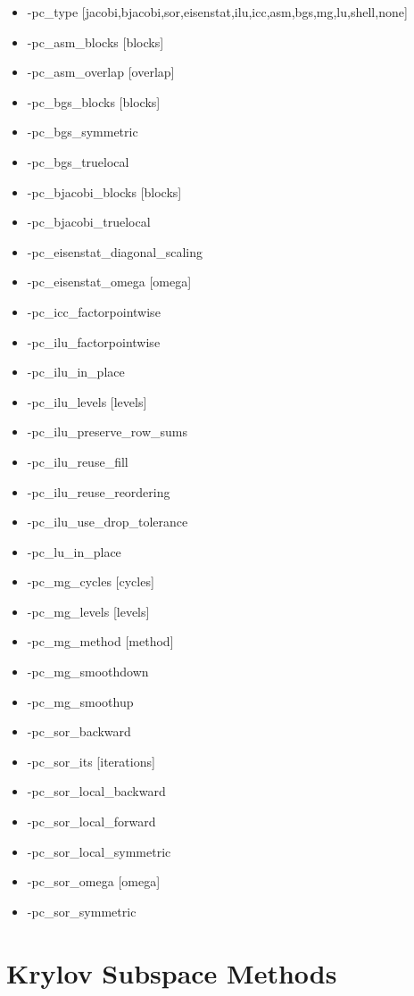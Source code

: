\begin{itemize}
\item -pc\_type [jacobi,bjacobi,sor,eisenstat,ilu,icc,asm,bgs,mg,lu,shell,none]
\item -pc\_asm\_blocks [blocks]
\item -pc\_asm\_overlap [overlap]
\item -pc\_bgs\_blocks [blocks]
\item -pc\_bgs\_symmetric
\item -pc\_bgs\_truelocal
\item -pc\_bjacobi\_blocks [blocks]
\item -pc\_bjacobi\_truelocal
\item -pc\_eisenstat\_diagonal\_scaling
\item -pc\_eisenstat\_omega [omega]
\item -pc\_icc\_factorpointwise
\item -pc\_ilu\_factorpointwise
\item -pc\_ilu\_in\_place
\item -pc\_ilu\_levels [levels]
\item -pc\_ilu\_preserve\_row\_sums
\item -pc\_ilu\_reuse\_fill
\item -pc\_ilu\_reuse\_reordering
\item -pc\_ilu\_use\_drop\_tolerance
\item -pc\_lu\_in\_place
\item -pc\_mg\_cycles [cycles]
\item -pc\_mg\_levels [levels]
\item -pc\_mg\_method [method]
\item -pc\_mg\_smoothdown
\item -pc\_mg\_smoothup
\item -pc\_sor\_backward
\item -pc\_sor\_its [iterations]
\item -pc\_sor\_local\_backward
\item -pc\_sor\_local\_forward
\item -pc\_sor\_local\_symmetric
\item -pc\_sor\_omega [omega]
\item -pc\_sor\_symmetric
\end{itemize}


{\small
\noindent

}

\section{Krylov Subspace Methods}

